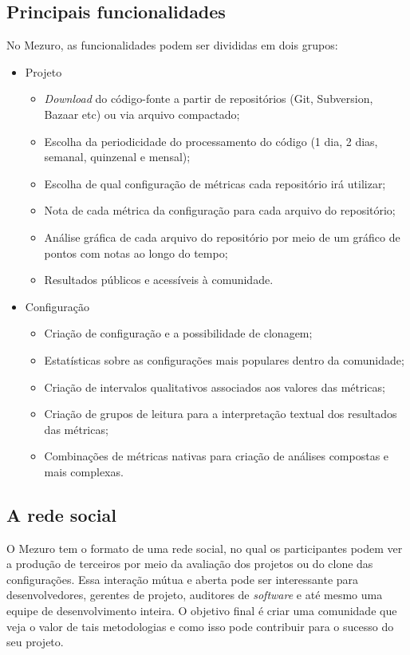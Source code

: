 \documentclass{llncs}
\begin{document}
  \subsection{Principais funcionalidades}\label{sec:princ-funcionalidades}
  No Mezuro, as funcionalidades podem ser divididas em dois grupos:
  \begin{itemize}
    \item Projeto
      \begin{itemize}
      \item \textit{Download} do código-fonte a partir de repositórios (Git, Subversion, Bazaar etc) ou via arquivo compactado;
          \item Escolha da periodicidade do processamento do código (1 dia, 2 dias, semanal, quinzenal e mensal);
          \item Escolha de qual configuração de métricas cada repositório irá utilizar;
          \item Nota de cada métrica da configuração para cada arquivo do repositório;
          \item Análise gráfica de cada arquivo do repositório por meio de um gráfico de pontos com notas ao longo do tempo;
          \item Resultados públicos e acessíveis à comunidade.
      \end{itemize}
      \item Configuração
      \begin{itemize}
      \item Criação de configuração e a possibilidade de clonagem;
          \item Estatísticas sobre as configurações mais populares dentro da comunidade;
          \item Criação de intervalos qualitativos associados aos valores das métricas;
          \item Criação de grupos de leitura para a interpretação textual dos resultados das métricas;
          \item Combinações de métricas nativas para criação de análises compostas e mais complexas.
      \end{itemize}
  \end{itemize}

  \subsection{A rede social}\label{sec:user-potencial}
  O Mezuro tem o formato de uma rede social, no qual os participantes podem ver a produção de terceiros por meio da avaliação dos projetos ou do clone das configurações. Essa interação mútua e aberta pode ser interessante para desenvolvedores, gerentes de projeto, auditores de \textit{software} e até mesmo uma equipe de desenvolvimento inteira. O objetivo final é criar uma comunidade que veja o valor de tais metodologias e como isso pode contribuir para o sucesso do seu projeto.
\end{document}
